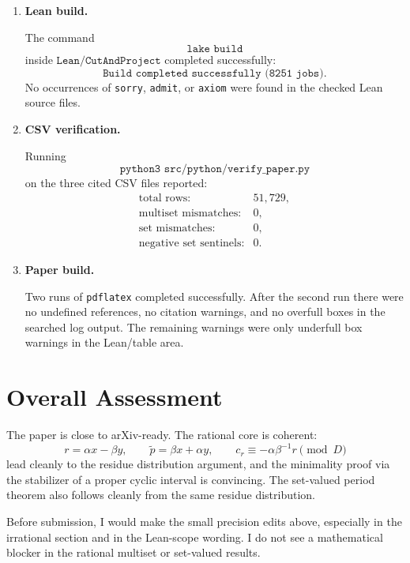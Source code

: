 \documentclass[11pt]{article}
\begin{document}
\begin{enumerate}[leftmargin=*]

\item \textbf{Lean build.}

The command
\[
\texttt{lake build}
\]
inside \(\texttt{Lean/CutAndProject}\) completed successfully:
\[
\texttt{Build completed successfully (8251 jobs).}
\]
No occurrences of \texttt{sorry}, \texttt{admit}, or \texttt{axiom} were
found in the checked Lean source files.

\item \textbf{CSV verification.}

Running
\[
\texttt{python3 src/python/verify\_paper.py}
\]
on the three cited CSV files reported:
\[
\begin{array}{rl}
\text{total rows:} & 51{,}729,\\
\text{multiset mismatches:} & 0,\\
\text{set mismatches:} & 0,\\
\text{negative set sentinels:} & 0.
\end{array}
\]

\item \textbf{Paper build.}

Two runs of \texttt{pdflatex} completed successfully.  After the second run
there were no undefined references, no citation warnings, and no overfull
boxes in the searched log output.  The remaining warnings were only underfull
box warnings in the Lean/table area.

\end{enumerate}

\section*{Overall Assessment}

The paper is close to arXiv-ready.  The rational core is coherent:
\[
r=\alpha x-\beta y,\qquad
\tilde p=\beta x+\alpha y,\qquad
c_r\equiv -\alpha\beta^{-1}r \pmod D
\]
lead cleanly to the residue distribution argument, and the minimality proof
via the stabilizer of a proper cyclic interval is convincing.  The set-valued
period theorem also follows cleanly from the same residue distribution.

Before submission, I would make the small precision edits above, especially in
the irrational section and in the Lean-scope wording.  I do not see a
mathematical blocker in the rational multiset or set-valued results.
\end{document}
